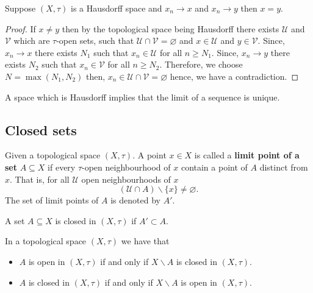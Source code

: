 \documentclass[12pt, a4paper]{article}
\begin{document}
\begin{lemma}
    Suppose \((X,\tau)\) is a Hausdorff space and \(x_n \to x\) and \(x_n \to y\) then \(x=y\).
\end{lemma}

\begin{proof}
    If \(x \neq y\) then by the topological space being Hausdorff there exists \(\mathcal{U}\) and \(\mathcal{V}\) which are  \(\tau\)-open sets, such that \(\mathcal{U} \cap \mathcal{V} = \varnothing\) and \(x \in \mathcal{U}\) and \(y \in \mathcal{V}\). Since, \(x_n \to x\) there exists \(N_1\) such that \(x_n \in \mathcal{U}\) for all \(n \geq N_1\). Since, \(x_n \to y\) there exists \(N_2\) such that \(x_n \in \mathcal{V}\) for all \(n \geq N_2\). Therefore, we choose \(N = \max(N_1,N_2)\) then, \(x_n \in \mathcal{U} \cap \mathcal{V} = \varnothing\) hence, we have a contradiction.
\end{proof}

\begin{mdnote}
    A space which is Hausdorff implies that the limit of a sequence is unique.
\end{mdnote}

\subsection{Closed sets}

\begin{definition}
    Given a topological space \((X,\tau)\). A point \(x \in X\) is called a \textbf{limit point of a set} \(A \subseteq X\) if every \(\tau\)-open neighbourhood of \(x\) contain a point of \(A\) distinct from \(x\). That is, for all \(\mathcal{U}\) open neighbourhoods of \(x\) 
    \[(\mathcal{U} \cap A) \backslash \{x\} \neq \varnothing.\]
    The set of limit points of \(A\) is denoted by \(A'\).
\end{definition}

\begin{definition}
    A set \(A \subseteq X\) is closed in \((X,\tau)\) if \(A' \subset A\).
\end{definition}

\begin{mdthm}
    In a topological space \((X,\tau)\) we have that
    \begin{itemize}
        \item \(A\) is open in \((X,\tau)\) if and only if \(X\backslash A\) is closed in \((X,\tau)\).
        \item \(A\) is closed in \((X,\tau)\) if and only if \(X \backslash A\) is open in \((X,\tau)\).
    \end{itemize}
\end{mdthm}
\end{document}
